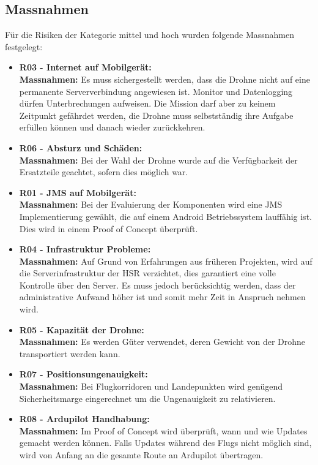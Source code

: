 \subsection{Massnahmen}
Für die Risiken der Kategorie mittel und hoch wurden folgende Massnahmen festgelegt:
\begin{itemize}
	\item{\textbf{R03 - Internet auf Mobilgerät:} \\
	\textbf{Massnahmen:} Es muss sichergestellt werden, dass die Drohne nicht auf eine permanente Serververbindung angewiesen ist. Monitor und Datenlogging dürfen Unterbrechungen aufweisen. Die Mission darf aber zu keinem Zeitpunkt gefährdet werden, die Drohne muss selbstständig ihre Aufgabe erfüllen können und danach wieder zurückkehren.}
	
	\item{\textbf{R06 - Absturz und Schäden:} \\
	\textbf{Massnahmen:} Bei der Wahl der Drohne wurde auf die Verfügbarkeit der Ersatzteile geachtet, sofern dies möglich war. }

	\item{\textbf{R01 - JMS auf Mobilgerät:} \\
	\textbf{Massnahmen:} Bei der Evaluierung der Komponenten wird eine JMS Implementierung gewählt, die auf einem Android Betriebssystem lauffähig ist. Dies wird in einem Proof of Concept überprüft.}
	
	\item{\textbf{R04 - Infrastruktur Probleme:} \\
	\textbf{Massnahmen:} Auf Grund von Erfahrungen aus früheren Projekten, wird auf die Serverinfrastruktur der HSR verzichtet, dies garantiert eine volle Kontrolle über den Server. Es muss jedoch berücksichtig werden, dass der administrative Aufwand höher ist und somit mehr Zeit in Anspruch nehmen wird.}
	
	\item{\textbf{R05 - Kapazität der Drohne:} \\
	\textbf{Massnahmen:} Es werden Güter verwendet, deren Gewicht von der Drohne transportiert werden kann.}	
	
	\item{\textbf{R07 - Positionsungenauigkeit:} \\
	\textbf{Massnahmen:} Bei Flugkorridoren und Landepunkten wird genügend Sicherheitsmarge eingerechnet um die Ungenauigkeit zu relativieren.}
	
	\item{\textbf{R08 - Ardupilot Handhabung:} \\
	\textbf{Massnahmen:}  Im Proof of Concept wird überprüft, wann und wie Updates gemacht werden können. Falls Updates während des Flugs nicht möglich sind, wird von Anfang an die gesamte Route an Ardupilot übertragen.}
	

\end{itemize}
